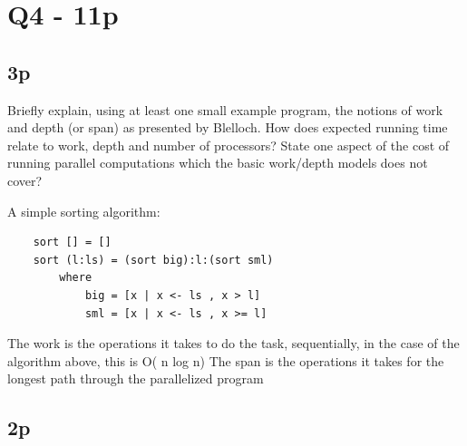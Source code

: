 \section{Q4 - 11p}
\subsection{3p}
Briefly explain, using at least one small example program, the notions of work and depth (or span) as presented by Blelloch. How does expected running time relate to work, depth and number of processors? State one aspect of the cost of running parallel computations which the basic work/depth models does not cover?

A simple sorting algorithm:
\begin{lstlisting}
	sort [] = []
	sort (l:ls) = (sort big):l:(sort sml)
		where
			big = [x | x <- ls , x > l]
			sml = [x | x <- ls , x >= l]
\end{lstlisting}
The work is the operations it takes to do the task, sequentially, in the case of the algorithm above, this is O( n log n)
The span is the operations it takes for the longest path through the parallelized program
\subsection{2p}